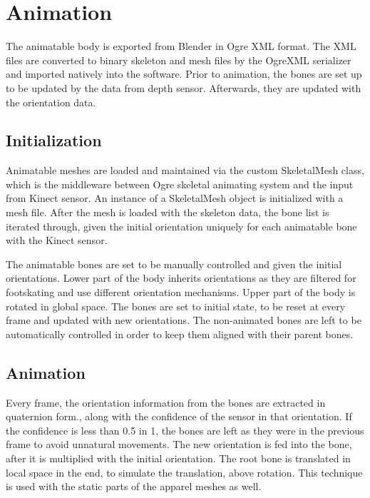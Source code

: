 \chapter{Animation}
\label{chapter_animation}

The animatable body is exported from Blender in Ogre XML format. The XML files are converted to binary skeleton and mesh files by the OgreXML serializer
 and imported natively into the software. Prior to animation, the bones are set up to be updated by the data from depth sensor. 
 Afterwards, they are updated with the orientation data.

\section{Initialization}
\label{section_animation_initialization}

Animatable meshes are loaded and maintained via the custom SkeletalMesh class, which is the middleware between Ogre skeletal animating system and the input from Kinect sensor. 
An instance of a SkeletalMesh object is initialized with a mesh file. After the mesh is loaded with the skeleton data, the bone list is iterated through, given the initial 
orientation uniquely for each animatable bone with the Kinect sensor. 

The animatable bones are set to be manually controlled and given the initial orientations. Lower part of the body inherits orientations as they are filtered for footskating and 
use different orientation mechanisms. Upper part of the body is rotated in global space. The bones are set to initial state, to be reset at every frame and updated with new orientations.
 The non-animated bones are left to be automatically controlled in order to keep them aligned with their parent bones. 

\section{Animation}
\label{section_animation}
Every frame, the orientation information from the bones are extracted in quaternion form., along with the confidence of the sensor in that orientation. 
If the confidence is less than 0.5 in 1, the bones are left as they were in the previous frame to avoid unnatural movements.   The new orientation is fed into the bone,
after it is multiplied with the initial orientation. The root bone is translated in local space in the end, to simulate the translation, above rotation. This technique 
is used with the static parts of the apparel meshes as well. 

